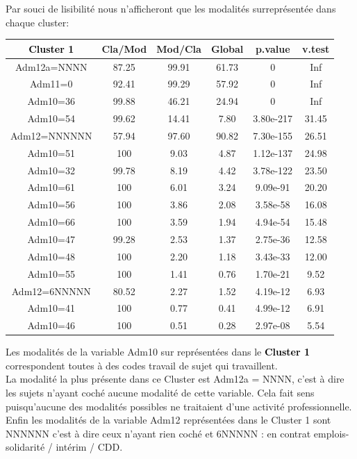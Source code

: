 \documentclass{book}
\begin{document}
\noindent
Par souci de lisibilité nous n'afficheront que les modalités surreprésentée dans chaque cluster:

\setlength\arrayrulewidth{2pt}
\begin{tabular}{|c||ccccc|}
\hline
  \textbf{\textcolor{black}{Cluster 1}}       &    Cla/Mod  &   Mod/Cla   &   Global   &    p.value  &   v.test  \\
\hline
\hline 
            
Adm12a=NNNN  & 87.25 &99.91 &61.73  &0 &       Inf\\
Adm11=0      & 92.41 &99.29 &57.92  &0 &       Inf\\
Adm10=36     & 99.88 &46.21 &24.94  &0 &      Inf\\
Adm10=54     & 99.62 &14.41 & 7.80 &3.80e-217  &31.45\\
Adm12=NNNNNN & 57.94 &97.60 &90.82 &7.30e-155 & 26.51\\
Adm10=51     & 100 & 9.03 & 4.87 &1.12e-137  &24.98\\
Adm10=32     & 99.78 & 8.19 & 4.42 &3.78e-122  &23.50\\
Adm10=61     & 100 & 6.01 & 3.24 & 9.09e-91 & 20.20\\
Adm10=56     & 100 & 3.86 & 2.08 & 3.58e-58 & 16.08\\
Adm10=66     & 100 & 3.59 & 1.94 & 4.94e-54 & 15.48\\
Adm10=47     & 99.28 & 2.53 & 1.37 & 2.75e-36 & 12.58\\
Adm10=48    & 100 & 2.20 & 1.18 & 3.43e-33 & 12.00\\
Adm10=55    & 100& 1.41 & 0.76 & 1.70e-21 &  9.52\\
Adm12=6NNNNN & 80.52 & 2.27 & 1.52 & 4.19e-12  & 6.93\\
Adm10=41    & 100 & 0.77 & 0.41 & 4.99e-12 &  6.91\\
Adm10=46    & 100 &0.51 & 0.28 & 2.97e-08 &  5.54\\
\hline
\end{tabular}

\noindent
Les modalités de la variable Adm10 sur représentées dans le \textbf{\textcolor{black}{Cluster 1}} correspondent toutes à des codes travail de sujet qui travaillent. \\
La modalité la plus présente dans ce Cluster est Adm12a = NNNN, c'est à dire les sujets n'ayant coché aucune modalité de cette variable. Cela fait sens puisqu'aucune des modalités possibles ne traitaient d'une activité professionnelle. \\
Enfin les modalités de la variable Adm12 représentées dans le Cluster 1 sont NNNNNN c'est à dire ceux n'ayant rien coché et 6NNNNN : en contrat emplois-solidarité / intérim / CDD.\\
\end{document}
